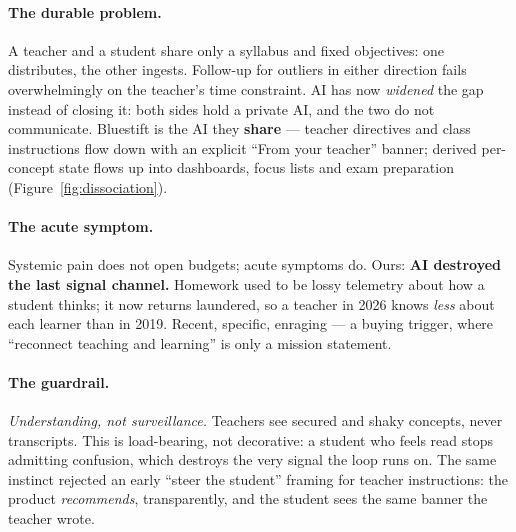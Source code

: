 \documentclass[11pt,a4paper]{article}
\begin{document}
\paragraph{The durable problem.} A teacher and a student share only a syllabus
and fixed objectives: one distributes, the other ingests. Follow-up for
outliers in either direction fails overwhelmingly on the teacher's time
constraint. AI has now \emph{widened} the gap instead of closing it: both
sides hold a private AI, and the two do not communicate. Bluestift is the AI
they \textbf{share} --- teacher directives and class instructions flow down
with an explicit ``From your teacher'' banner; derived per-concept state flows
up into dashboards, focus lists and exam preparation (Figure~\ref{fig:dissociation}).

\paragraph{The acute symptom.} Systemic pain does not open budgets; acute
symptoms do. Ours: \textbf{AI destroyed the last signal channel.} Homework
used to be lossy telemetry about how a student thinks; it now returns
laundered, so a teacher in 2026 knows \emph{less} about each learner than in
2019. Recent, specific, enraging --- a buying trigger, where ``reconnect
teaching and learning'' is only a mission statement.

\paragraph{The guardrail.} \emph{Understanding, not surveillance.} Teachers see
secured and shaky concepts, never transcripts. This is load-bearing, not
decorative: a student who feels read stops admitting confusion, which destroys
the very signal the loop runs on. The same instinct rejected an early
``steer the student'' framing for teacher instructions: the product
\emph{recommends}, transparently, and the student sees the same banner the
teacher wrote.
\end{document}
